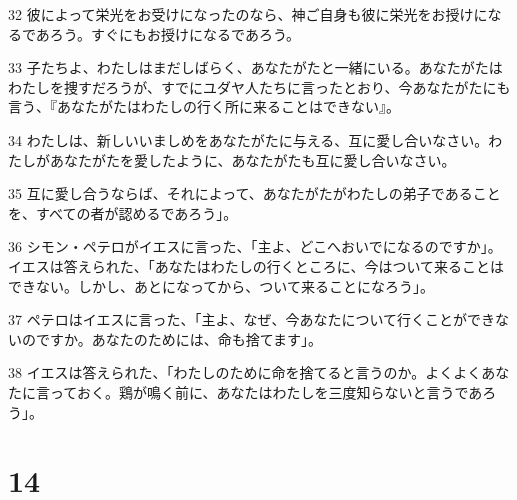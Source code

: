 \par 32 彼によって栄光をお受けになったのなら、神ご自身も彼に栄光をお授けになるであろう。すぐにもお授けになるであろう。
\par 33 子たちよ、わたしはまだしばらく、あなたがたと一緒にいる。あなたがたはわたしを捜すだろうが、すでにユダヤ人たちに言ったとおり、今あなたがたにも言う、『あなたがたはわたしの行く所に来ることはできない』。
\par 34 わたしは、新しいいましめをあなたがたに与える、互に愛し合いなさい。わたしがあなたがたを愛したように、あなたがたも互に愛し合いなさい。
\par 35 互に愛し合うならば、それによって、あなたがたがわたしの弟子であることを、すべての者が認めるであろう」。
\par 36 シモン・ペテロがイエスに言った、「主よ、どこへおいでになるのですか」。イエスは答えられた、「あなたはわたしの行くところに、今はついて来ることはできない。しかし、あとになってから、ついて来ることになろう」。
\par 37 ペテロはイエスに言った、「主よ、なぜ、今あなたについて行くことができないのですか。あなたのためには、命も捨てます」。
\par 38 イエスは答えられた、「わたしのために命を捨てると言うのか。よくよくあなたに言っておく。鶏が鳴く前に、あなたはわたしを三度知らないと言うであろう」。

\chapter{14}

